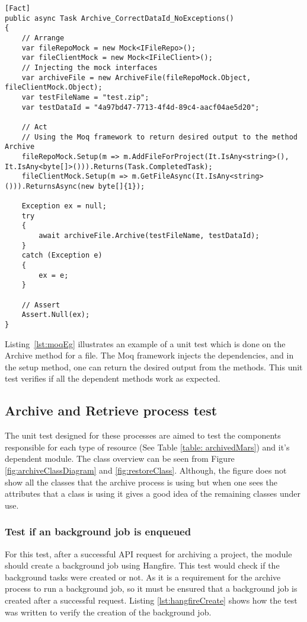 \begin{lstlisting}[language={[Sharp]C}, caption={Example of faking objects using Moq framework}, captionpos=b,label={lst:moqEg}]
[Fact]
public async Task Archive_CorrectDataId_NoExceptions()
{
    // Arrange
    var fileRepoMock = new Mock<IFileRepo>();
    var fileClientMock = new Mock<IFileClient>();
    // Injecting the mock interfaces 
    var archiveFile = new ArchiveFile(fileRepoMock.Object, fileClientMock.Object);
    var testFileName = "test.zip";
    var testDataId = "4a97bd47-7713-4f4d-89c4-aacf04ae5d20";
    
    // Act
    // Using the Moq framework to return desired output to the method Archive
    fileRepoMock.Setup(m => m.AddFileForProject(It.IsAny<string>(), It.IsAny<byte[]>())).Returns(Task.CompletedTask);
    fileClientMock.Setup(m => m.GetFileAsync(It.IsAny<string>())).ReturnsAsync(new byte[]{1});

    Exception ex = null;
    try
    {
        await archiveFile.Archive(testFileName, testDataId);
    }
    catch (Exception e)
    {
        ex = e;
    }
    
    // Assert
    Assert.Null(ex);
}
\end{lstlisting}

Listing~\ref{lst:moqEg} illustrates an example of a unit test which is done on the Archive method for a file. The Moq framework injects the dependencies, and in the setup method,
one can return the desired output from the methods. This unit test verifies if all the dependent methods work as expected.

\subsection{Archive and Retrieve process test}
The unit test designed for these processes are aimed to test the components responsible for each type of resource (See Table \ref{table: archivedMars}) and it's 
dependent module. The class overview can be seen from Figure \ref{fig:archiveClassDiagram} and \ref{fig:restoreClass}. Although, the figure does not show all the classes that the archive process is using
but when one sees the attributes that a class is using it gives a good idea of the remaining classes under use.

\subsubsection{Test if an background job is enqueued}
For this test, after a successful API request for archiving a project, the module should create a background job using Hangfire. This test would check if the
background tasks were created or not. As it is a requirement for the archive process to run a background job, so it must be ensured that a background job is created 
after a successful request. Listing \ref{lst:hangfireCreate} shows how the test was written to verify the creation of the background job.

